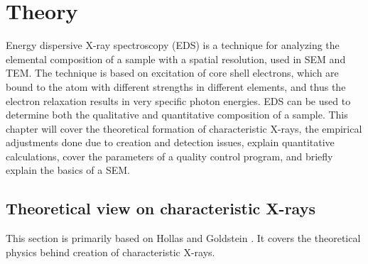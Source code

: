 \chapter{Theory}
\label{chap:theory}


Energy dispersive X-ray spectroscopy (EDS) is a technique for analyzing the elemental composition of a sample with a spatial resolution, used in SEM and TEM.
The technique is based on excitation of core shell electrons, which are bound to the atom with different strengths in different elements, and thus the electron relaxation results in very specific photon energies.
EDS can be used to determine both the qualitative and quantitative composition of a sample.
This chapter will cover the theoretical formation of characteristic X-rays, the empirical adjustments done due to creation and detection issues, explain quantitative calculations, cover the parameters of a quality control program, and briefly explain the basics of a SEM.










\section{Theoretical view on characteristic X-rays}
\label{sec:theory:theoreticalxray}


This section is primarily based on Hollas \cite[Ch. 8.2]{hollas_modern_2004} and Goldstein \cite[Ch. 4.2]{goldstein_scanning_2018}.
It covers the theoretical physics behind creation of characteristic X-rays.










